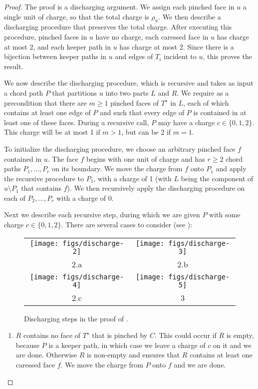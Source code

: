 \documentclass{patmorin}
\newcommand{\dual}[1]{{#1}^\star}
\begin{document}
\begin{proof}
   The proof is a discharging argument.  We assign each pinched face in 
   $u$ a single unit of charge, so that the total charge is $\rho_u$.
   We then describe a discharging procedure that preserves the total
   charge.  After executing this procedure, pinched faces in $u$
   have no charge, each caressed face in $u$ has charge at most 2,
   and each keeper path in $u$ has charge at most 2.  Since there is a
   bijection between keeper paths in $u$ and edges of $T_i$ incident to
   $u$, this proves the result.

   We now describe the discharging procedure, which is recursive and takes as
   input a chord path $P$ that partitions $u$ into two parts $L$ and $R$.
   We require as a precondition that there are $m\ge 1$ pinched faces
   of $\dual{T}$ in $L$, each of which contains at least one edge of $P$ and
   such that every edge of $P$ is contained in at least one of these faces.
   During a recursive call, $P$ may have a charge $c\in\{0,1,2\}$. This
   charge will be at most 1 if $m> 1$, but can be 2 if $m=1$.

   To initialize the discharging procedure, we choose an arbitrary pinched
   face $f$ contained in $u$.  The face $f$ begins with one unit of charge
   and has $r\ge 2$ chord paths $P_1,\ldots,P_r$ on its boundary.
   We move the charge from $f$ onto $P_1$ and apply the recursive
   procedure to $P_1$, with a charge of 1 (with $L$ being the component
   of $u\setminus P_1$ that contains $f$).  We then recursively apply the
   discharging procedure on each of $P_2,\ldots,P_r$ with a charge of 0.

   Next we describe each recursive step, during which we are given $P$
   with some charge $c\in\{0,1,2\}$.  There are several cases to consider
   (see ):
	\begin{figure}
		\begin{center}
		\begin{tabular}{cc}
			\texttt{[image: figs/discharge-2]} &
			\texttt{[image: figs/discharge-3]} \\
			 2.a & 2.b \\[1.5em]
			\texttt{[image: figs/discharge-4]} &
			\texttt{[image: figs/discharge-5]} \\
			 2.c & 3 
		\end{tabular}
		\end{center}
		\caption{Discharging steps in the proof of .}
	\end{figure}
  \begin{enumerate}
     \item $R$ contains no face of $\dual{T}$ that is pinched by $C$.
     This could occur if $R$ is empty, because $P$ is a keeper path,
     in which case we leave a charge of $c$ on it and we are done.
     Otherwise $R$ is non-empty and   ensures that
     $R$ contains at least one caressed face $f$.  We move the charge
     from $P$ onto $f$ and we are done.


\end{enumerate}
\end{proof}
\end{document}
